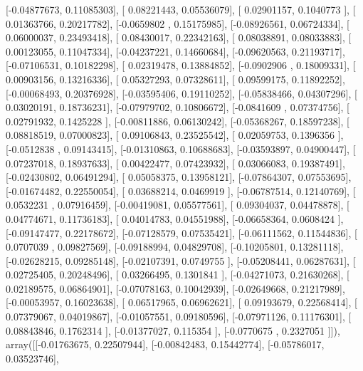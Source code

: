 \documentclass{article}
\begin{document}
       [-0.04877673,  0.11085303],
       [ 0.08221443,  0.05536079],
       [ 0.02901157,  0.1040773 ],
       [ 0.01363766,  0.20217782],
       [-0.0659802 ,  0.15175985],
       [-0.08926561,  0.06724334],
       [ 0.06000037,  0.23493418],
       [ 0.08430017,  0.22342163],
       [ 0.08038891,  0.08033883],
       [ 0.00123055,  0.11047334],
       [-0.04237221,  0.14660684],
       [-0.09620563,  0.21193717],
       [-0.07106531,  0.10182298],
       [ 0.02319478,  0.13884852],
       [-0.0902906 ,  0.18009331],
       [ 0.00903156,  0.13216336],
       [ 0.05327293,  0.07328611],
       [ 0.09599175,  0.11892252],
       [-0.00068493,  0.20376928],
       [-0.03595406,  0.19110252],
       [-0.05838466,  0.04307296],
       [ 0.03020191,  0.18736231],
       [-0.07979702,  0.10806672],
       [-0.0841609 ,  0.07374756],
       [ 0.02791932,  0.1425228 ],
       [-0.00811886,  0.06130242],
       [-0.05368267,  0.18597238],
       [ 0.08818519,  0.07000823],
       [ 0.09106843,  0.23525542],
       [ 0.02059753,  0.1396356 ],
       [-0.0512838 ,  0.09143415],
       [-0.01310863,  0.10688683],
       [-0.03593897,  0.04900447],
       [ 0.07237018,  0.18937633],
       [ 0.00422477,  0.07423932],
       [ 0.03066083,  0.19387491],
       [-0.02430802,  0.06491294],
       [ 0.05058375,  0.13958121],
       [-0.07864307,  0.07553695],
       [-0.01674482,  0.22550054],
       [ 0.03688214,  0.0469919 ],
       [-0.06787514,  0.12140769],
       [ 0.0532231 ,  0.07916459],
       [-0.00419081,  0.05577561],
       [ 0.09304037,  0.04478878],
       [ 0.04774671,  0.11736183],
       [ 0.04014783,  0.04551988],
       [-0.06658364,  0.0608424 ],
       [-0.09147477,  0.22178672],
       [-0.07128579,  0.07535421],
       [-0.06111562,  0.11544836],
       [ 0.0707039 ,  0.09827569],
       [-0.09188994,  0.04829708],
       [-0.10205801,  0.13281118],
       [-0.02628215,  0.09285148],
       [-0.02107391,  0.0749755 ],
       [-0.05208441,  0.06287631],
       [ 0.02725405,  0.20248496],
       [ 0.03266495,  0.1301841 ],
       [-0.04271073,  0.21630268],
       [ 0.02189575,  0.06864901],
       [-0.07078163,  0.10042939],
       [-0.02649668,  0.21217989],
       [-0.00053957,  0.16023638],
       [ 0.06517965,  0.06962621],
       [ 0.09193679,  0.22568414],
       [ 0.07379067,  0.04019867],
       [-0.01057551,  0.09180596],
       [-0.07971126,  0.11176301],
       [ 0.08843846,  0.1762314 ],
       [-0.01377027,  0.115354  ],
       [-0.0770675 ,  0.2327051 ]]), array([[-0.01763675,  0.22507944],
       [-0.00842483,  0.15442774],
       [-0.05786017,  0.03523746],
\end{document}
